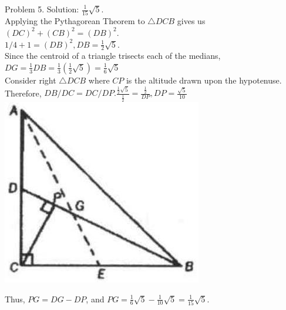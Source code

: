 \documentclass[10pt]{article}
\begin{document}
Problem 5. Solution: \(\frac{1}{15} \sqrt{5}\).\\
Applying the Pythagorean Theorem to \(\triangle D C B\) gives us\\
\((D C)^{2}+(C B)^{2}=(D B)^{2}\).\\
\(1 / 4+1=(D B)^{2}, D B=\frac{1}{2} \sqrt{5}\).\\
Since the centroid of a triangle trisects each of the medians,\\
\(D G=\frac{1}{3} D B=\frac{1}{3}\left(\frac{1}{2} \sqrt{5}\right)=\frac{1}{6} \sqrt{5}\)\\
Consider right \(\triangle D C B\) where \(C P\) is the altitude drawn upon the hypotenuse.\\
Therefore, \(D B / D C=D C / D P . \frac{\frac{1}{2} \sqrt{5}}{\frac{1}{2}}=\frac{\frac{1}{2}}{D P}, D P=\frac{\sqrt{5}}{10}\)\\
\includegraphics[max width=\textwidth, center]{2025_04_17_97bc1f7e44d93c271a88g-019}

Thus, \(P G=D G-D P\), and \(P G=\frac{1}{6} \sqrt{5}-\frac{1}{10} \sqrt{5}=\frac{1}{15} \sqrt{5}\).
\end{document}
